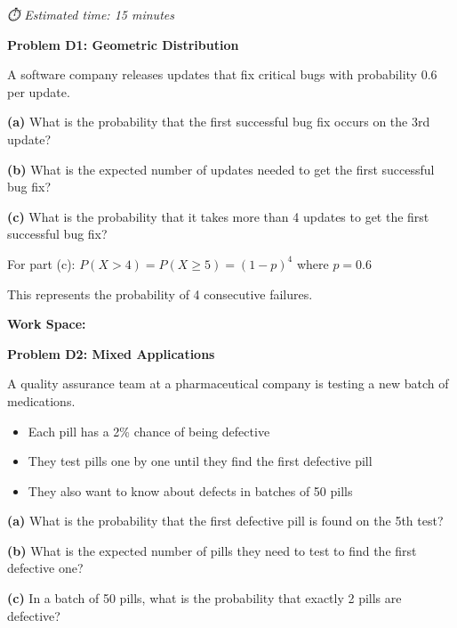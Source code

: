 \documentclass[
  11pt,
]{article}
\providecommand{\tightlist}{%
  \setlength{\itemsep}{0pt}\setlength{\parskip}{0pt}}\usepackage{longtable,booktabs,array}
\begin{document}
\emph{⏱️ Estimated time: 15 minutes}

\textbf{Problem D1: Geometric Distribution}

A software company releases updates that fix critical bugs with
probability 0.6 per update.

\textbf{(a)} What is the probability that the first successful bug fix
occurs on the 3rd update?

\textbf{(b)} What is the expected number of updates needed to get the
first successful bug fix?

\textbf{(c)} What is the probability that it takes more than 4 updates
to get the first successful bug fix?

\begin{tcolorbox}[enhanced jigsaw, coltitle=black, colback=white, titlerule=0mm, left=2mm, opacityback=0, bottomtitle=1mm, title=\textcolor{quarto-callout-tip-color}{\faLightbulb}\hspace{0.5em}{Tip}, colframe=quarto-callout-tip-color-frame, toptitle=1mm, arc=.35mm, leftrule=.75mm, toprule=.15mm, bottomrule=.15mm, breakable, rightrule=.15mm, colbacktitle=quarto-callout-tip-color!10!white, opacitybacktitle=0.6]

For part (c): \(P(X > 4) = P(X \geq 5) = (1-p)^4\) where \(p = 0.6\)

This represents the probability of 4 consecutive failures.

\end{tcolorbox}

\textbf{Work Space:}

\textbf{Problem D2: Mixed Applications}

A quality assurance team at a pharmaceutical company is testing a new
batch of medications.

\begin{itemize}
\tightlist
\item
  Each pill has a 2\% chance of being defective
\item
  They test pills one by one until they find the first defective pill
\item
  They also want to know about defects in batches of 50 pills
\end{itemize}

\textbf{(a)} What is the probability that the first defective pill is
found on the 5th test?

\textbf{(b)} What is the expected number of pills they need to test to
find the first defective one?

\textbf{(c)} In a batch of 50 pills, what is the probability that
exactly 2 pills are defective?
\end{document}
